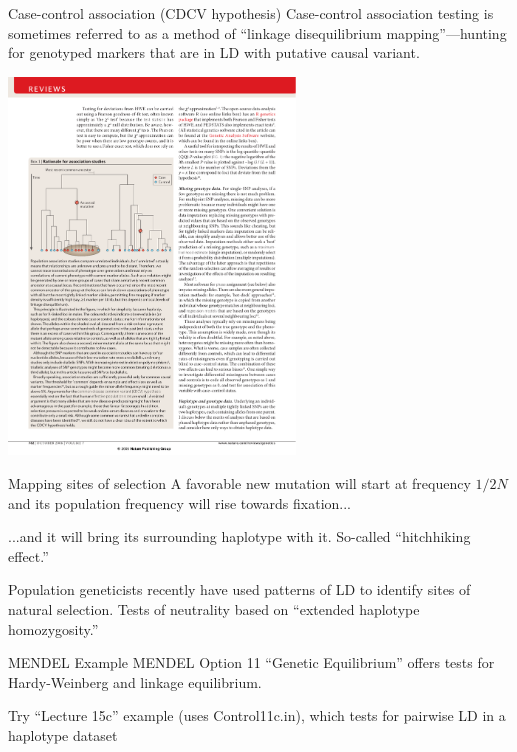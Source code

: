 \documentclass[serif,mathserif,professionalfonts,svgnames]{beamer}
\begin{document}
\begin{frame}{Case-control association (CDCV hypothesis)}
    Case-control association testing is sometimes referred to as a
    method of ``linkage disequilibrium mapping''---hunting for
    genotyped markers that are in LD with putative causal variant.

    \begin{center}
    \includegraphics[width=3in]{cdcv.pdf}
    \end{center}
\end{frame}



\begin{frame}{Mapping sites of selection}
 A favorable new mutation will start at frequency $1/2N$ and its
 population frequency will rise towards fixation...

 ...and it will bring its surrounding haplotype with it.  So-called
 ``hitchhiking effect.''

 Population geneticists recently have used patterns of LD to identify
 sites of natural selection.  Tests of neutrality based on ``extended haplotype homozygosity.''
\end{frame}

\begin{frame}{MENDEL Example}
  MENDEL Option 11 ``Genetic Equilibrium'' offers tests for
  Hardy-Weinberg and linkage equilibrium.  

  Try ``Lecture 15c'' example (uses Control11c.in), which tests for pairwise LD in a haplotype dataset

\end{frame}
\end{document}
